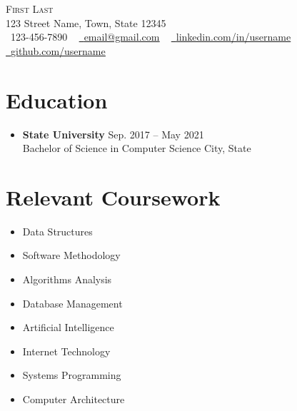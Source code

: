 \documentclass[letterpaper,5pt]{article}
\begin{document}
    

    
    \begin{center}
        {\Huge \scshape First Last} \\ \vspace{1pt}
        123 Street Name, Town, State 12345 \\ \vspace{1pt}
        \small \raisebox{-0.1\height}\faPhone\ 123-456-7890 ~ \href{mailto:x@gmail.com}{\raisebox{-0.2\height}\faEnvelope\ \underline{email@gmail.com}} ~ 
        \href{https://linkedin.com/in//}{\raisebox{-0.2\height}\faLinkedin\ \underline{linkedin.com/in/username}}  ~
        \href{https://github.com/}{\raisebox{-0.2\height}\faGithub\ \underline{github.com/username}}
        \vspace{-8pt}
    \end{center}
    
   \section{Education}
    \begin{itemize}[leftmargin=0in, label={}]
        \item
            \textbf{State University} \hfill Sep. 2017 -- May 2021 \\
            Bachelor of Science in Computer Science \hfill City, State
    \end{itemize}
    
    \vspace*{-7mm}
    \section{Relevant Coursework}
    \vspace*{-5mm}
           \begin{multicols}{4}
            \begin{itemize}[ itemsep=-5pt, parsep=3pt]
                \item\small Data Structures
                \item Software Methodology
                \item Algorithms Analysis
                \item Database Management
                \item Artificial Intelligence
                \item Internet Technology
                \item Systems Programming
                \item Computer Architecture
            \end{itemize}
        \end{multicols}  
    
\end{document}

